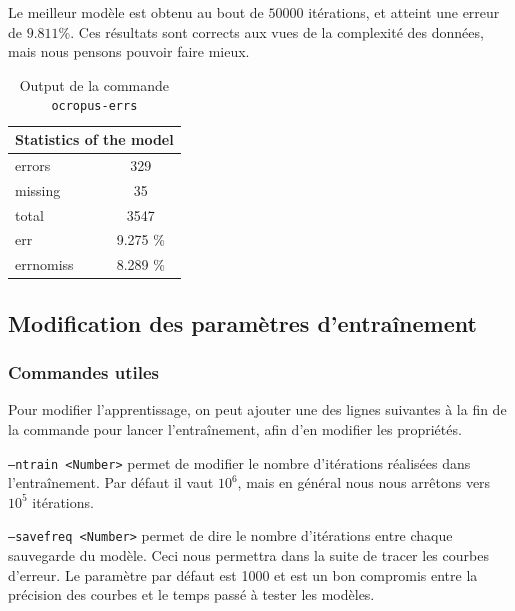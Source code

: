 \documentclass{report}
\begin{document}
Le meilleur modèle est obtenu au bout de $50 000$ itérations, et atteint une erreur de $9.811\%$.
Ces résultats sont corrects aux vues de la complexité des données, mais nous pensons pouvoir faire mieux.

\begin{table}[!h]
    \centering
    \begin{tabular}{|l|l|lc|l|l|}
        \hline
        \multicolumn{6}{|c|}{\cellcolor[gray]{0.8}Statistics of the model} \\ \hline
        \multicolumn{3}{|l|}{errors}    & \multicolumn{3}{c|}{329}         \\ \hline
        \multicolumn{3}{|l|}{missing}   & \multicolumn{3}{c|}{35}          \\ \hline
        \multicolumn{3}{|l|}{total}     & \multicolumn{3}{c|}{3547}        \\ \hline
        \multicolumn{3}{|l|}{err}       & \multicolumn{3}{c|}{9.275 \%}    \\ \hline
        \multicolumn{3}{|l|}{errnomiss} & \multicolumn{3}{c|}{8.289 \%}    \\ \hline
    \end{tabular}
    \caption{Output de la commande \texttt{ocropus-errs}}
    \label{t1}
\end{table}

\subsection{Modification des paramètres d'entraînement}

\subsubsection{Commandes utiles}

Pour modifier l'apprentissage, on peut ajouter une des lignes suivantes à la fin de la commande pour lancer l'entraînement, afin d'en modifier les propriétés.

\texttt{--ntrain <Number>} permet de modifier le nombre d'itérations réalisées dans l'entraînement.
Par défaut il vaut $10^6$, mais en général nous nous arrêtons vers $10^5$ itérations.

\texttt{--savefreq <Number>} permet de dire le nombre d'itérations entre chaque sauvegarde du modèle.
Ceci nous permettra dans la suite de tracer les courbes d'erreur.
Le paramètre par défaut est 1000 et est un bon compromis entre la précision des courbes et le temps passé à tester les modèles.
\end{document}
